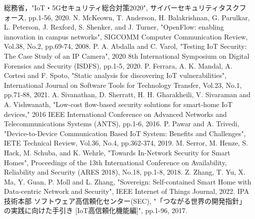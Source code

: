 \documentclass[Japanese]{dicomopapers}
\begin{document}
\begin{thebibliography}{10}
	 総務省，"IoT・5Gセキュリティ総合対策2020", サイバーセキュリティタスクフォース, pp.1-56, 2020.
	 N. McKeown, T. Anderson, H. Balakrishnan, G. Parulkar, L. Peterson, J. Rexford, S. Shenker, and J. Turner, "OpenFlow: enabling innovation in campus networks", SIGCOMM Computer Communication Review, Vol.38, No.2, pp.69-74, 2008.
	 P. A. Abdalla and C. Varol, "Testing IoT Security: The Case Study of an IP Camera", 2020 8th International Symposium on Digital Forensics and Security (ISDFS), pp.1-5, 2020.
	 P. Ferrara, A. K. Mandal, A. Cortesi and F. Spoto, "Static analysis for discovering IoT vulnerabilities", International Journal on Software Tools for Technology Transfer, Vol.23, No.1, pp.71-88, 2021.
	 A. Sivanathan, D. Sherratt, H. H. Gharakheili, V. Sivaraman and A. Vishwanath, "Low-cost flow-based security solutions for smart-home IoT devices," 2016 IEEE International Conference on Advanced Networks and Telecommunications Systems (ANTS), pp.1-6, 2016.
	 P. Pawar and A. Trivedi, "Device-to-Device Communication Based IoT System: Benefits and Challenges", IETE Technical Review, Vol.36, No.4, pp.362-374, 2019.
	 M. Serror, M. Henze, S. Hack, M. Schuba, and K. Wehrle, "Towards In-Network Security for Smart Homes", Proceedings of the 13th International Conference on Availability, Reliability and Security (ARES 2018), No.18, pp.1-8, 2018.
	 Z. Zhang, T. Yu, X. Ma, Y. Guan, P. Moll and L. Zhang, "Sovereign: Self-contained Smart Home with Data-centric Network and Security", IEEE Internet of Things Journal, 2022.
	 IPA技術本部 ソフトウェア高信頼化センター(SEC), "「つながる世界の開発指針」の実践に向けた手引き [IoT高信頼化機能編]", pp.1-96, 2017.
\end{thebibliography}
\end{document}
